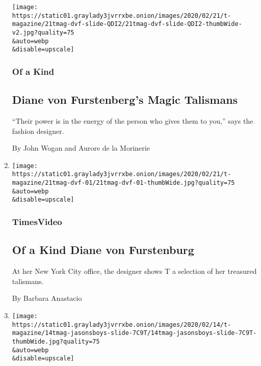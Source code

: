 \begin{enumerate}
  \texttt{[image: https://static01.graylady3jvrrxbe.onion/images/2020/02/21/t-magazine/21tmag-dvf-slide-QDI2/21tmag-dvf-slide-QDI2-thumbWide-v2.jpg?quality=75\\\&auto=webp\\\&disable=upscale]}

  \hypertarget{of-a-kind}{%
  \subsubsection{Of a Kind}\label{of-a-kind}}

  \hypertarget{diane-von-furstenbergs-magic-talismans}{%
  \subsection{Diane von Furstenberg's Magic
  Talismans}\label{diane-von-furstenbergs-magic-talismans}}

  ``Their power is in the energy of the person who gives them to you,''
  says the fashion designer.

  By John Wogan and Aurore de la Morinerie
\item
  \href{/video/t-magazine/fashion/100000006990423/of-a-kind-diane-von-furstenburg.html}{}

  \texttt{[image: https://static01.graylady3jvrrxbe.onion/images/2020/02/21/t-magazine/21tmag-dvf-01/21tmag-dvf-01-thumbWide.jpg?quality=75\\\&auto=webp\\\&disable=upscale]}

  \hypertarget{timesvideo-1}{%
  \subsubsection{TimesVideo}\label{timesvideo-1}}

  \hypertarget{of-a-kind--diane-von-furstenburg}{%
  \subsection{Of a Kind \textbar{} Diane von
  Furstenburg}\label{of-a-kind--diane-von-furstenburg}}

  At her New York City office, the designer shows T a selection of her
  treasured talismans.

  By Barbara Anastacio
\item
  \href{/2020/02/21/t-magazine/spring-womens-fashion-issue.html}{}

  \texttt{[image: https://static01.graylady3jvrrxbe.onion/images/2020/02/14/t-magazine/14tmag-jasonsboys-slide-7C9T/14tmag-jasonsboys-slide-7C9T-thumbWide.jpg?quality=75\\\&auto=webp\\\&disable=upscale]}


\end{enumerate}

